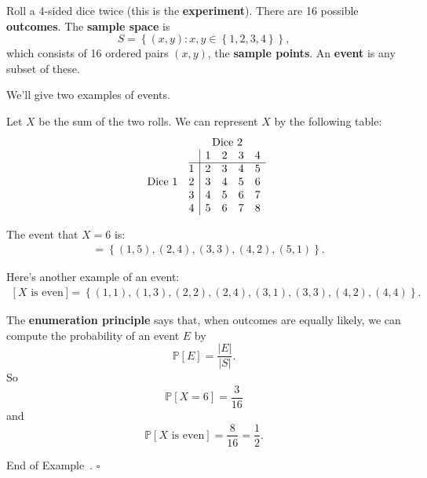 \documentclass[10pt]{article}
\theoremstyle{definition}
\newtheorem{example}[theorem]{Example}
\renewenvironment{example}
{\begin{oldexample}}
  {\par\smallskip\hfill   End of Example~\theexample. $\square$    \par\end{oldexample}}
\newcommand{\1}[1]{\textbf{1}_{\left[#1\right]}} %
\def\P{\mathbb{P}} %
\begin{document}
\begin{example}[Sum 2d4]
  \label{ex:sum-2d4}
  Roll a 4-sided dice twice (this is the \textbf{experiment}). There are 16 possible
  \textbf{outcomes}. The \textbf{sample space} is
  \begin{equation*}
    S = \left\{(x,y): x,y\in \left\{1,2,3,4\right\} \right\},
  \end{equation*}
  which consists of 16 ordered pairs $(x,y)$, the \textbf{sample points}. An
  \textbf{event} is any subset of these.

  We'll give two examples of events.

  Let $X$ be the sum of the two rolls. We can represent $X$ by the following table:
  \begin{equation*}
    \begin{array}{c@{\quad}c|cccc} & \multicolumn{5}{c}{\text{Dice 2}} \\ & &
      1 & 2 & 3 & 4 \\ \cline{2-6}  & 1 & 2 & 3 & 4 & 5 \\ \text{Dice 1} & 2 & 3 & 4 & 5 & 6 \\ & 3 & 4 & 5 & 6 & 7 \\ & 4 & 5 & 6 & 7 & 8 \end{array}
  \end{equation*}

  The event that $X=6$ is:
  \begin{align*}
    [X=6] 
    &= \left\{(1,5), (2,4), (3,3), (4,2), (5,1)\right\}.
  \end{align*}

  Here's another example of an event:
  \begin{align*}
    \left[ X \text{ is even} \right]
    &= \left\{(1,1), (1,3), (2,2), (2,4), (3,1), (3,3), (4,2), (4,4) \right\}.
  \end{align*}

  The \textbf{enumeration principle} says that, when outcomes are equally
  likely, we can compute the probability of an event $E$ by
  \begin{equation*}
    \P\left[E \right] = \frac{|E|}{|S|}.
  \end{equation*}
  So
  \begin{equation*}
    \P\left[X=6 \right] = \frac{3}{16}
  \end{equation*}
  and
  \begin{equation*}
    \P\left[ X\text{ is even} \right] =\frac{8}{16} = \frac{1}{2}.
  \end{equation*}
\end{example}
\end{document}

